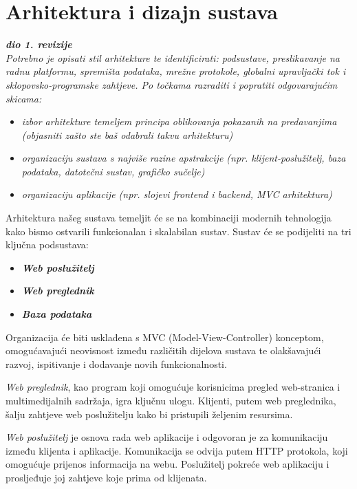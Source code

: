 \chapter{Arhitektura i dizajn sustava}
		
		\textbf{\textit{dio 1. revizije}}\\

		\textit{ Potrebno je opisati stil arhitekture te identificirati: podsustave, preslikavanje na radnu platformu, spremišta podataka, mrežne protokole, globalni upravljački tok i sklopovsko-programske zahtjeve. Po točkama razraditi i popratiti odgovarajućim skicama:}
	\begin{itemize}
		\item 	\textit{izbor arhitekture temeljem principa oblikovanja pokazanih na predavanjima (objasniti zašto ste baš odabrali takvu arhitekturu)}
		\item 	\textit{organizaciju sustava s najviše razine apstrakcije (npr. klijent-poslužitelj, baza podataka, datotečni sustav, grafičko sučelje)}
		\item 	\textit{organizaciju aplikacije (npr. slojevi frontend i backend, MVC arhitektura) }		
	\end{itemize}
	
	Arhitektura našeg sustava temeljit će se na kombinaciji modernih tehnologija kako bismo ostvarili funkcionalan i skalabilan sustav. Sustav će se podijeliti na tri ključna podsustava: 
	\begin{itemize}
		\item 	\textit{\textbf{Web poslužitelj}}		
		\item 	\textit{\textbf{Web preglednik}}	
		\item 	\textit{\textbf{Baza podataka}}
	\end{itemize}
	Organizacija će biti usklađena s MVC (Model-View-Controller) konceptom, omogućavajući neovisnost između različitih dijelova sustava te olakšavajući razvoj, ispitivanje i dodavanje novih funkcionalnosti.
	
	\textit{Web preglednik}, kao program koji omogućuje korisnicima pregled web-stranica i multimedijalnih sadržaja, igra ključnu ulogu. Klijenti, putem web preglednika, šalju zahtjeve web poslužitelju kako bi pristupili željenim resursima.
	
	\textit{Web poslužitelj} je osnova rada web aplikacije i odgovoran je za komunikaciju između klijenta i aplikacije. Komunikacija se odvija putem HTTP protokola, koji omogućuje prijenos informacija na webu. Poslužitelj pokreće web aplikaciju i prosljeđuje joj zahtjeve koje prima od klijenata.	

